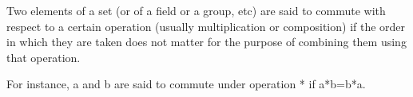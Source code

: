 Two elements of a set (or of a field or a group, etc) are said to commute 
with respect to a certain operation (usually multiplication or composition)
if the order in which they are taken does not matter for the purpose
of combining them using that operation.
\par
For instance, a and b are said to commute under operation * if a*b=b*a.